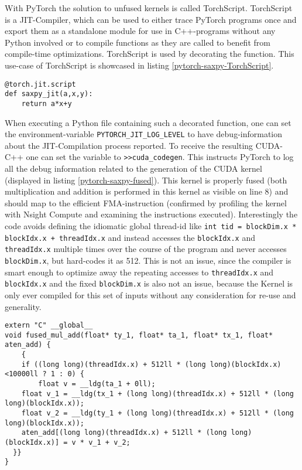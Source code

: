 \documentclass[english,11pt,a4paper,table]{article} %
\begin{document}
With PyTorch the solution to unfused kernels is called TorchScript.
TorchScript is a JIT-Compiler, which can be used to either trace PyTorch programs once and export them as a standalone module for use in C++-programs without any Python involved or to compile functions as they are called to benefit from compile-time optimizations.
TorchScript is used by decorating the function.
This use-case of TorchScript is showcased in listing \ref{pytorch-saxpy-TorchScript}.

\begin{verbatim}
@torch.jit.script
def saxpy_jit(a,x,y):
    return a*x+y
\end{verbatim}

When executing a Python file containing such a decorated function, one can set the environment-variable \texttt{PYTORCH\_JIT\_LOG\_LEVEL} to have debug-information about the JIT-Compilation process reported.
To receive the resulting CUDA-C++ one can set the variable to \texttt{>>cuda\_codegen}.
This instructs PyTorch to log all the debug information related to the generation of the CUDA kernel (displayed in listing \ref{pytorch-saxpy-fused}).
This kernel is properly fused (both multiplication and addition is performed in this kernel as visible on line 8) and should map to the efficient FMA-instruction (confirmed by profiling the kernel with Nsight Compute and examining the instructions executed).
Interestingly the code avoids defining the idiomatic global thread-id like \texttt{int tid = blockDim.x * blockIdx.x + threadIdx.x} and instead accesses the \texttt{blockIdx.x} and \texttt{threadIdx.x} multiple times over the course of the program and never accesses \texttt{blockDim.x}, but hard-codes it as 512.
This is not an issue, since the compiler is smart enough to optimize away the repeating accesses to \texttt{threadIdx.x} and \texttt{blockIdx.x} and the fixed \texttt{blockDim.x} is also not an issue, because the Kernel is only ever compiled for this set of inputs without any consideration for re-use and generality.

\begin{verbatim}
extern "C" __global__
void fused_mul_add(float* ty_1, float* ta_1, float* tx_1, float* aten_add) {
	{
	if ((long long)(threadIdx.x) + 512ll * (long long)(blockIdx.x)<10000ll ? 1 : 0) {
	    float v = __ldg(ta_1 + 0ll);
    float v_1 = __ldg(tx_1 + (long long)(threadIdx.x) + 512ll * (long long)(blockIdx.x));
    float v_2 = __ldg(ty_1 + (long long)(threadIdx.x) + 512ll * (long long)(blockIdx.x));
    aten_add[(long long)(threadIdx.x) + 512ll * (long long)(blockIdx.x)] = v * v_1 + v_2;
  }}
}
\end{verbatim}
\end{document}
